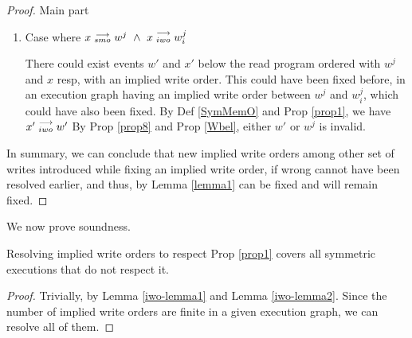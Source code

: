\begin{proof}{Main part}
\begin{itemize}
\begin{enumerate}
                            \item Case where $x\stackrel{\longrightarrow}{_{smo}}w^j \ \wedge \ x\stackrel{\longrightarrow}{_{iwo}}w_i^j$
                                
                                There could exist events $w'$ and $x'$ below the read program ordered with $w^j$ and $x$ resp, with an implied write order. This could have been fixed before, in an execution graph having an implied write order between $w^j$ and $w_i^j$, which could have also been fixed.
                                By Def \ref{SymMemO} and Prop \ref{prop1}, we have $x'\stackrel{\longrightarrow}{_{iwo}}w'$
                                By Prop \ref{prop8} and Prop \ref{Wbel}, either $w'$ or $w^j$ is invalid.

                        \end{enumerate}
                \end{itemize}

                In summary, we can conclude that new implied write orders among other set of writes introduced while fixing an implied write order, if wrong cannot have been resolved earlier, and thus, by Lemma \ref{lemma1} can be fixed and will remain fixed.

        \end{proof}

    We now prove soundness.
    \begin{theorem}
        \label{iwo-sound}
        Resolving implied write orders to respect Prop \ref{prop1} covers all symmetric executions that do not respect it. 
    \end{theorem}

    \begin{proof}
        Trivially, by Lemma \ref{iwo-lemma1} and Lemma \ref{iwo-lemma2}.
        Since the number of implied write orders are finite in a given execution graph, we can resolve all of them. 
    \end{proof}

    